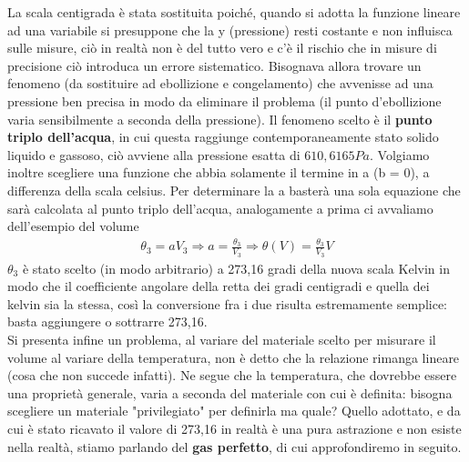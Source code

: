 \documentclass[10pt,a4paper]{article}
\begin{document}
La scala centigrada è stata sostituita poiché, quando si adotta la funzione lineare ad una variabile si presuppone che la y (pressione) resti costante e non influisca sulle misure, ciò in realtà non è del tutto vero e c'è il rischio che in misure di precisione ciò introduca un errore sistematico. Bisognava allora trovare un fenomeno (da sostituire ad ebollizione e congelamento) che avvenisse ad una pressione ben precisa in modo da eliminare il problema (il punto d'ebollizione varia sensibilmente a seconda della pressione). Il fenomeno scelto è il \textbf{punto triplo dell'acqua}, in cui questa raggiunge contemporaneamente stato solido liquido e gassoso, ciò avviene alla pressione esatta di $610,6165 Pa$. Volgiamo inoltre scegliere una funzione che abbia solamente il termine in a (b = 0), a differenza della scala celsius. Per determinare la a basterà una sola equazione che sarà calcolata al punto triplo dell'acqua, analogamente a prima ci avvaliamo dell'esempio del volume
\begin{align*}
	\theta_3 = a V_3 \Rightarrow a = \frac{\theta_3}{V_3} \Rightarrow \theta(V) = \frac{\theta_3}{V_3} V 
\end{align*}
$\theta_3$ è stato scelto (in modo arbitrario) a 273,16 gradi della nuova scala Kelvin in modo che il coefficiente angolare della retta dei gradi centigradi e quella dei kelvin sia la stessa, così la conversione fra i due risulta estremamente semplice: basta aggiungere o sottrarre 273,16.\\
Si presenta infine un problema, al variare del materiale scelto per misurare il volume al variare della temperatura, non è detto che la relazione rimanga lineare (cosa che non succede infatti). Ne segue che la temperatura, che dovrebbe essere una proprietà generale, varia a seconda del materiale con cui è definita: bisogna scegliere un materiale "privilegiato" per definirla ma quale? Quello adottato, e da cui è stato ricavato il valore di 273,16 in realtà è una pura astrazione e non esiste nella realtà, stiamo parlando del \textbf{gas perfetto}, di cui approfondiremo in seguito.
\end{document}

